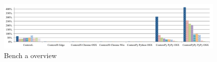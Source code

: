 \begin{figure}
  \centering
  \includegraphics[width=\linewidth]{bench/malte-a/malte-a-1}
  \caption{Bench a overview}
  \label{fig:malte-a-overview}
\end{figure}

